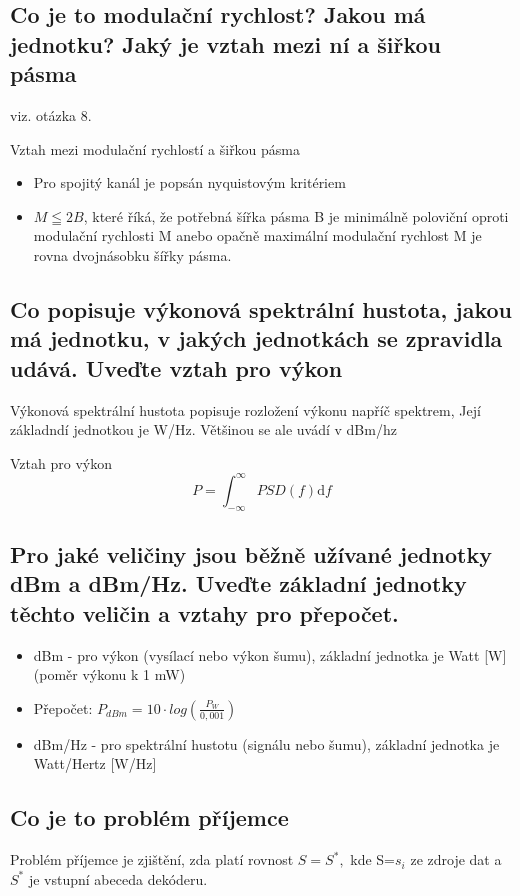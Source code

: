 \subsection{Co je to modulační rychlost? Jakou má jednotku? Jaký je vztah mezi ní a šiřkou pásma}
viz. otázka 8.

Vztah mezi modulační rychlostí a šiřkou pásma
\begin{itemize}
    \item Pro spojitý kanál je popsán nyquistovým kritériem
    \item $M \leqq 2B $, které říká, že potřebná šířka pásma B je minimálně poloviční oproti modulační rychlosti M anebo opačně maximální modulační rychlost M je rovna dvojnásobku šířky pásma.
\end{itemize}

\subsection{Co popisuje výkonová spektrální hustota, jakou má jednotku, v jakých jednotkách se zpravidla udává. Uveďte vztah pro výkon}
 Výkonová spektrální hustota popisuje rozložení výkonu napříč spektrem, Její základndí jednotkou je W/Hz. Většinou se ale uvádí v dBm/hz

Vztah pro výkon
$$P = \int_{-\infty}^{\infty} PSD(f)\mathrm{d}f$$

\subsection{Pro jaké veličiny jsou běžně užívané jednotky dBm a dBm/Hz. Uveďte základní jednotky
těchto veličin a vztahy pro přepočet.}
\begin{itemize}
    \item dBm - pro výkon (vysílací nebo výkon šumu), základní jednotka je Watt [W] (poměr výkonu k 1 mW)
    \item Přepočet: $P_{dBm}=10\cdot log\left(\frac{P_W}{0,001}\right)$
    \item dBm/Hz - pro spektrální hustotu (signálu nebo šumu), základní jednotka je Watt/Hertz [W/Hz]
\end{itemize}

\subsection{Co je to problém příjemce}
Problém příjemce je zjištění, zda platí rovnost $S=S^*, $ kde S=${s_i}$ ze zdroje dat a $S^*$ je vstupní abeceda dekóderu.

